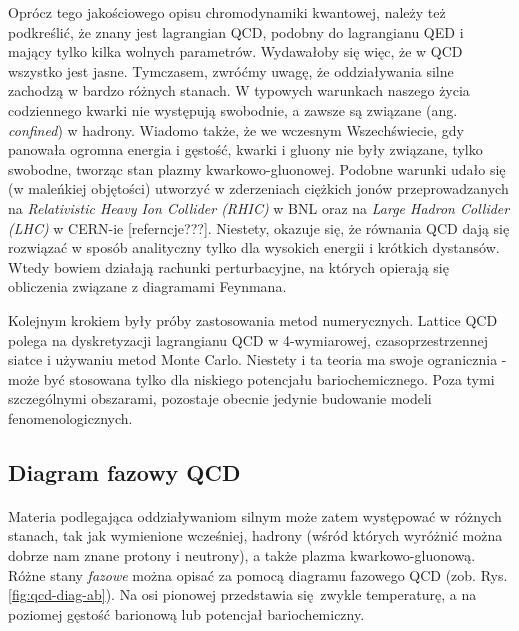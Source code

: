 \documentclass[a4paper,12pt]{article}
\begin{document}
Oprócz tego jakościowego opisu chromodynamiki kwantowej, należy też podkreślić, że znany jest lagrangian QCD, podobny do lagrangianu QED i mający tylko kilka wolnych parametrów. Wydawałoby się więc, że w QCD wszystko jest jasne. Tymczasem, zwróćmy uwagę, że oddziaływania silne zachodzą w bardzo różnych stanach. W typowych warunkach naszego życia codziennego kwarki nie występują swobodnie, a zawsze są związane (ang. \textit{confined}) w hadrony. Wiadomo także, że we wczesnym Wszechświecie, gdy panowała ogromna energia i gęstość, kwarki i gluony nie były związane, tylko swobodne, tworząc stan plazmy kwarkowo-gluonowej. Podobne warunki udało się (w maleńkiej objętości) utworzyć w zderzeniach ciężkich jonów przeprowadzanych na \textit{Relativistic Heavy Ion Collider (RHIC)} w BNL oraz na \textit{Large Hadron Collider (LHC)} w CERN-ie {\color{blue} [referncje???]}. Niestety, okazuje się, że równania QCD dają się rozwiązać w sposób analityczny tylko dla wysokich energii i krótkich dystansów. Wtedy bowiem działają rachunki perturbacyjne, na których opierają się obliczenia związane z diagramami Feynmana.

Kolejnym krokiem były próby zastosowania metod numerycznych. Lattice QCD polega na dyskretyzacji lagrangianu QCD w 4-wymiarowej, czasoprzestrzennej siatce i używaniu metod Monte Carlo. Niestety i ta teoria ma swoje ogranicznia - może być stosowana tylko dla niskiego potencjału bariochemicznego. Poza tymi szczególnymi obszarami, pozostaje obecnie jedynie budowanie modeli fenomenologicznych.

\subsection{Diagram fazowy QCD}
\paragraph{}
Materia podlegająca oddziaływaniom silnym może zatem występować w różnych stanach, tak jak wymienione wcześniej, hadrony (wśród których wyróżnić można dobrze nam znane protony i neutrony), a także plazma kwarkowo-gluonową. Różne stany \textit{fazowe} można opisać za pomocą diagramu fazowego QCD (zob. Rys. \ref{fig:qcd-diag-ab}). Na osi pionowej przedstawia się zwykle temperaturę, a na poziomej gęstość barionową lub potencjał bariochemiczny.
\end{document}
